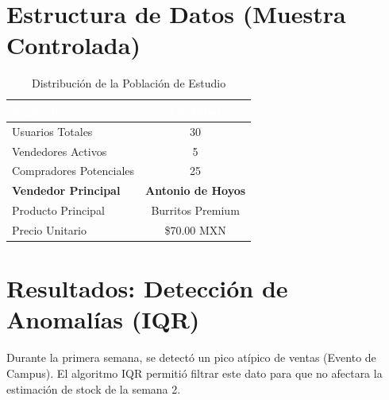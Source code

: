 \documentclass[12pt, a4paper]{article}
\begin{document}
\begin{center}
\end{center}

\section{Estructura de Datos (Muestra Controlada)}

\begin{table}[H]
\centering
\caption{Distribución de la Población de Estudio}
\begin{tabular}{l c}
\toprule
\rowcolor{tableheader}
\textcolor{white}{\textbf{Segmento}} & \textcolor{white}{\textbf{Cantidad}} \\
\midrule
Usuarios Totales & 30 \\
\rowcolor{lightgray}
Vendedores Activos & 5 \\
Compradores Potenciales & 25 \\
\midrule
\textbf{Vendedor Principal} & \textbf{Antonio de Hoyos} \\
\rowcolor{lightgray}
Producto Principal & Burritos Premium \\
Precio Unitario & \$70.00 MXN \\
\bottomrule
\end{tabular}
\end{table}

\section{Resultados: Detección de Anomalías (IQR)}

Durante la primera semana, se detectó un pico atípico de ventas (Evento de Campus). El algoritmo IQR permitió filtrar este dato para que no afectara la estimación de stock de la semana 2.
\end{document}
